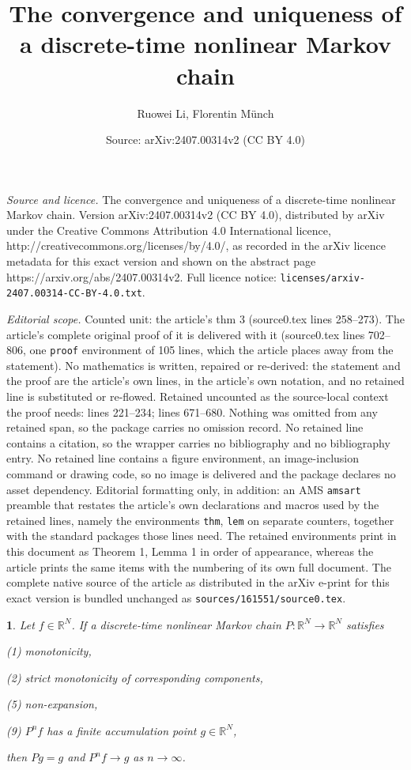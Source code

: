 \documentclass[10pt,a4paper]{amsart}
\title{The convergence and uniqueness of a discrete-time nonlinear Markov chain}
\author{Ruowei Li, Florentin M\"unch}
\date{Source: arXiv:2407.00314v2 (CC BY 4.0)}
\newtheorem{thm}{}
\begin{document}
\maketitle

\noindent\emph{Source and licence.} The convergence and uniqueness of a discrete-time nonlinear Markov chain. Version arXiv:2407.00314v2 (CC BY 4.0), distributed by arXiv under the Creative Commons Attribution 4.0 International licence, http://creativecommons.org/licenses/by/4.0/, as recorded in the arXiv licence metadata for this exact version and shown on the abstract page https://arxiv.org/abs/2407.00314v2. Full licence notice: \texttt{licenses/arxiv-2407.00314-CC-BY-4.0.txt}.\par\smallskip

\noindent\textit{Editorial scope.} Counted unit: the article's thm 3 (source0.tex lines 258--273). The article's complete original proof of it is delivered with it (source0.tex lines 702--806, one \texttt{proof} environment of 105 lines, which the article places away from the statement). No mathematics is written, repaired or re-derived: the statement and the proof are the article's own lines, in the article's own notation, and no retained line is substituted or re-flowed.  Retained uncounted as the source-local context the proof needs: lines 221--234; lines 671--680.  Nothing was omitted from any retained span, so the package carries no omission record.  No retained line contains a citation, so the wrapper carries no bibliography and no bibliography entry.  No retained line contains a figure environment, an image-inclusion command or drawing code, so no image is delivered and the package declares no asset dependency.  Editorial formatting only, in addition: an AMS \texttt{amsart} preamble that restates the article's own declarations and macros used by the retained lines, namely the environments \texttt{thm}, \texttt{lem} on separate counters, together with the standard packages those lines need.  The retained environments print in this document as Theorem 1, Lemma 1 in order of appearance, whereas the article prints the same items with the numbering of its own full document.  The complete native source of the article as distributed in the arXiv e-print for this exact version is bundled unchanged as \texttt{sources/161551/source0.tex}.
\begin{thm}
\label{thm:NLMC convergence 2}Let $f\in \mathbb{R}^{N}$. If a discrete-time nonlinear Markov
chain $P:\mathbb{R}^{N}\to\mathbb{R}^{N}$ satisfies

(1) monotonicity,

(2) strict monotonicity of corresponding components,

(5) non-expansion,

(9) $P^{n}f$ has a finite accumulation point $g\in \mathbb{R}^{N}$,

then $Pg=g$ and $P^{n}f\to g$ as $n\to\infty$. 
\end{thm}
\end{document}
